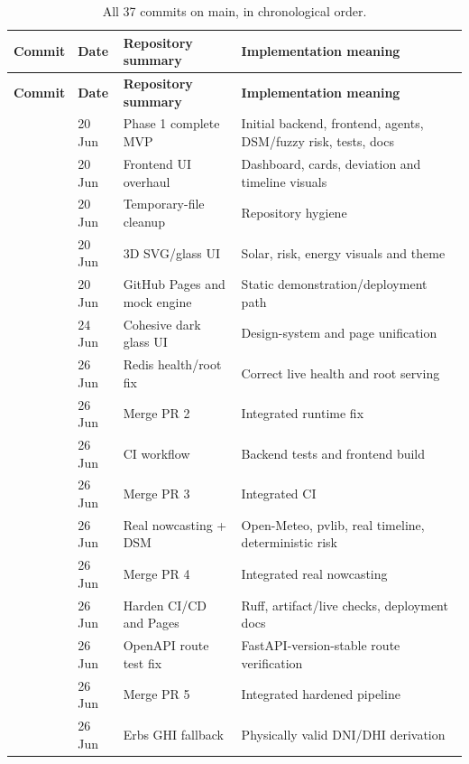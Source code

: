 \documentclass[10pt,a4paper]{article}
\begin{document}
\begin{footnotesize}
\begin{longtable}{@{}C{1.9cm}C{2.1cm}L{6.0cm}L{5.1cm}@{}}
\caption{All 37 commits on main, in chronological order.}\label{tab:commits}\\
\toprule
\textbf{Commit} & \textbf{Date} & \textbf{Repository summary} & \textbf{Implementation meaning}\\
\midrule
\endfirsthead
\toprule
\textbf{Commit} & \textbf{Date} & \textbf{Repository summary} & \textbf{Implementation meaning}\\
\midrule
\endhead
\bottomrule
\endfoot
{} & 20 Jun & Phase 1 complete MVP & Initial backend, frontend, agents, DSM/fuzzy risk, tests, docs\\
 & 20 Jun & Frontend UI overhaul & Dashboard, cards, deviation and timeline visuals\\
 & 20 Jun & Temporary-file cleanup & Repository hygiene\\
 & 20 Jun & 3D SVG/glass UI & Solar, risk, energy visuals and theme\\
 & 20 Jun & GitHub Pages and mock engine & Static demonstration/deployment path\\
 & 24 Jun & Cohesive dark glass UI & Design-system and page unification\\
 & 26 Jun & Redis health/root fix & Correct live health and root serving\\
 & 26 Jun & Merge PR 2 & Integrated runtime fix\\
 & 26 Jun & CI workflow & Backend tests and frontend build\\
 & 26 Jun & Merge PR 3 & Integrated CI\\
 & 26 Jun & Real nowcasting + DSM & Open-Meteo, pvlib, real timeline, deterministic risk\\
 & 26 Jun & Merge PR 4 & Integrated real nowcasting\\
 & 26 Jun & Harden CI/CD and Pages & Ruff, artifact/live checks, deployment docs\\
 & 26 Jun & OpenAPI route test fix & FastAPI-version-stable route verification\\
 & 26 Jun & Merge PR 5 & Integrated hardened pipeline\\
 & 26 Jun & Erbs GHI fallback & Physically valid DNI/DHI derivation\\

\end{longtable}
\end{footnotesize}
\end{document}
